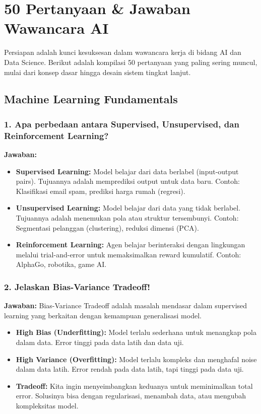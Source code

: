 \chapter{50 Pertanyaan \& Jawaban Wawancara AI}
\label{chap:interview}

Persiapan adalah kunci kesuksesan dalam wawancara kerja di bidang AI dan Data Science. Berikut adalah kompilasi 50 pertanyaan yang paling sering muncul, mulai dari konsep dasar hingga desain sistem tingkat lanjut.

\section{Machine Learning Fundamentals}

\subsection{1. Apa perbedaan antara Supervised, Unsupervised, dan Reinforcement Learning?}
\textbf{Jawaban:}
\begin{itemize}
    \item \textbf{Supervised Learning:} Model belajar dari data berlabel (input-output pairs). Tujuannya adalah memprediksi output untuk data baru. Contoh: Klasifikasi email spam, prediksi harga rumah (regresi).
    \item \textbf{Unsupervised Learning:} Model belajar dari data yang tidak berlabel. Tujuannya adalah menemukan pola atau struktur tersembunyi. Contoh: Segmentasi pelanggan (clustering), reduksi dimensi (PCA).
    \item \textbf{Reinforcement Learning:} Agen belajar berinteraksi dengan lingkungan melalui trial-and-error untuk memaksimalkan reward kumulatif. Contoh: AlphaGo, robotika, game AI.
\end{itemize}

\subsection{2. Jelaskan Bias-Variance Tradeoff!}
\textbf{Jawaban:}
Bias-Variance Tradeoff adalah masalah mendasar dalam supervised learning yang berkaitan dengan kemampuan generalisasi model.
\begin{itemize}
    \item \textbf{High Bias (Underfitting):} Model terlalu sederhana untuk menangkap pola dalam data. Error tinggi pada data latih dan data uji.
    \item \textbf{High Variance (Overfitting):} Model terlalu kompleks dan menghafal noise dalam data latih. Error rendah pada data latih, tapi tinggi pada data uji.
    \item \textbf{Tradeoff:} Kita ingin menyeimbangkan keduanya untuk meminimalkan total error. Solusinya bisa dengan regularisasi, menambah data, atau mengubah kompleksitas model.
\end{itemize}

